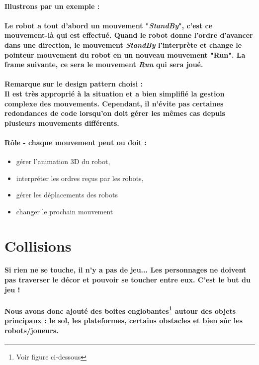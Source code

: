 \paragraph{Illustrons par un exemple :}
\paragraph{Le robot a tout d'abord un mouvement "\textit{StandBy}", c'est ce mouvement-là qui est effectué. Quand le robot donne l'ordre d'avancer dans une direction, le mouvement \textit{StandBy} l'interprète et change le pointeur mouvement du robot en un nouveau mouvement "Run". La frame suivante, ce sera le mouvement \textit{Run} qui sera joué.}

\paragraph{Remarque sur le design pattern choisi :\\
Il est très approprié à la situation et a bien simplifié la gestion complexe des mouvements. Cependant, il n'évite pas certaines redondances de code lorsqu'on doit gérer les mêmes cas depuis plusieurs mouvements différents.}


\paragraph{Rôle - chaque mouvement peut ou doit :}
\begin{itemize}
	\item gérer l'animation 3D du robot,
	\item interpréter les ordres reçus par les robots,
	\item gérer les déplacements des robots
	\item changer le prochain mouvement
\end{itemize}



\section{Collisions}
\paragraph{Si rien ne se touche, il n'y a pas de jeu... Les personnages ne doivent pas traverser le décor et pouvoir se toucher entre eux. C'est le but du jeu !}
\paragraph{Nous avons donc ajouté des \textbf{boites englobantes}\footnote{Voir figure ci-dessous} autour des objets principaux : le sol, les plateformes, certains obstacles et bien sûr les robots/joueurs.}


